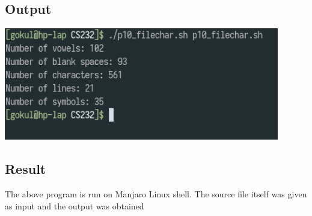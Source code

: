 \documentclass{article}
\begin{document}
\subsection{Output}
\includegraphics[width=0.9\textwidth]{img/p14.png}\newline

\subsection{Result}
The above program is run on Manjaro Linux shell. The source file itself was given
as input and the output was obtained
\end{document}
